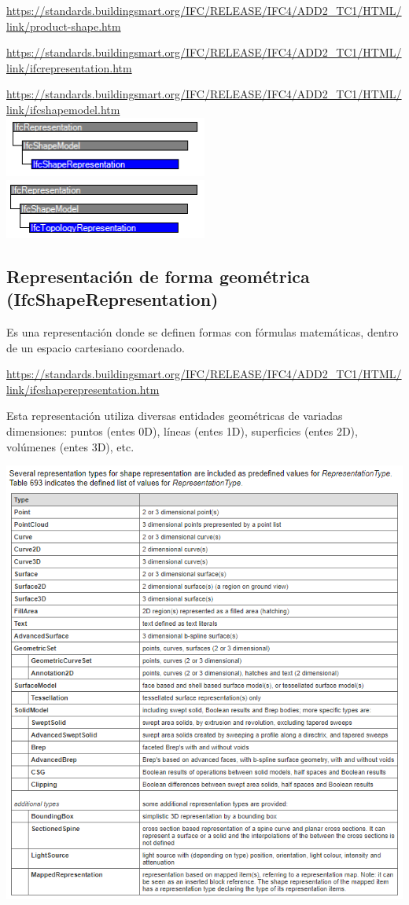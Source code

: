 \documentclass[spanish,12pt,a4paper,final,oneside]{book}
\begin{document}
\url{https://standards.buildingsmart.org/IFC/RELEASE/IFC4/ADD2_TC1/HTML/link/product-shape.htm}

\url{https://standards.buildingsmart.org/IFC/RELEASE/IFC4/ADD2_TC1/HTML/link/ifcrepresentation.htm}

\url{https://standards.buildingsmart.org/IFC/RELEASE/IFC4/ADD2_TC1/HTML/link/ifcshapemodel.htm}
\\\includegraphics[width=0.5\textwidth]{jerarquia de IfcShapeRepresentation}
\includegraphics[width=0.5\textwidth]{jerarquia de IfcTopologyRepresentation}


\subsection{Representación de forma geométrica (IfcShapeRepresentation)}
Es una representación donde se definen formas con fórmulas matemáticas, dentro de un espacio cartesiano coordenado.

\url{https://standards.buildingsmart.org/IFC/RELEASE/IFC4/ADD2_TC1/HTML/link/ifcshaperepresentation.htm}

Esta representación utiliza diversas entidades geométricas de variadas dimensiones: puntos (entes 0D), líneas (entes 1D), superficies (entes 2D), volúmenes (entes 3D), etc.

\includegraphics[width=\textwidth]{RepresentationType}
\end{document}
